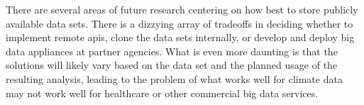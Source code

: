There are several areas of future research centering on how best to store publicly available data sets. There is a dizzying array of tradeoffs in deciding whether to implement remote \gls{api}s, clone the data sets internally, or develop and deploy big data appliances at partner agencies. What is even more daunting is that the solutions will likely vary based on the data set and the planned usage of the resulting analysis, leading to the problem of what works well for climate data may not work well for healthcare or other commercial big data services.\\